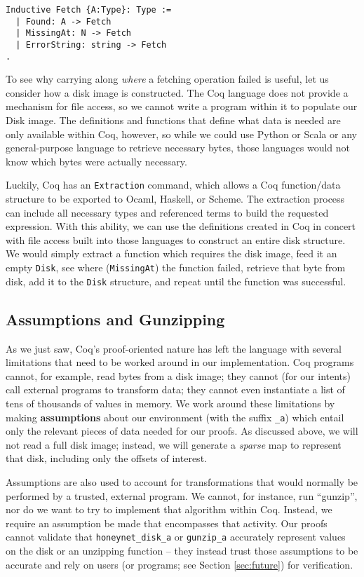 \documentclass[nocopyrightspace,preprint]{sigplanconf}
\begin{document}
\begin{lstlisting}
Inductive Fetch {A:Type}: Type :=
  | Found: A -> Fetch
  | MissingAt: N -> Fetch
  | ErrorString: string -> Fetch
.
\end{lstlisting}

To see why carrying along {\em where} a fetching operation failed is useful,
let us consider how a disk image is constructed. The Coq language does not
provide a mechanism for file access, so we cannot write a program within it to
populate our Disk image. The definitions and functions that define what data
is needed are only available within Coq, however, so while we could use Python
or Scala or any general-purpose language to retrieve necessary bytes, those
languages would not know which bytes were actually necessary.

Luckily, Coq has an {\tt Extraction} command, which allows a Coq function/data
structure to be exported to Ocaml, Haskell, or Scheme. The extraction process
can include all necessary types and referenced terms to build the requested
expression. With this ability, we can use the definitions created in Coq in
concert with file access built into those languages to construct an entire
disk structure. We would simply extract a function which requires the disk
image, feed it an empty {\tt Disk}, see where ({\tt MissingAt}) the function
failed, retrieve that byte from disk, add it to the {\tt Disk} structure, and
repeat until the function was successful.

\subsection{Assumptions and Gunzipping}
\label{subsec:gunzip}

As we just saw, Coq's proof-oriented nature has left the language with several
limitations that need to be worked around in our implementation. Coq programs
cannot, for example, read bytes from a disk image; they cannot (for our
intents) call external programs to transform data; they cannot even
instantiate a list of tens of thousands of values in memory. We work around
these limitations by making {\bf assumptions} about our environment (with the
suffix {\tt \_a}) which entail only the relevant pieces of data needed for our
proofs. As discussed above, we will not read a full disk image; instead, we
will generate a {\it sparse} map to represent that disk, including only the
offsets of interest.

Assumptions are also used to account for transformations that would normally
be performed by a trusted, external program. We cannot, for instance, run
``gunzip'', nor do we want to try to implement that algorithm within Coq.
Instead, we require an assumption be made that encompasses that activity. Our
proofs cannot validate that {\tt honeynet\_disk\_a} or {\tt gunzip\_a}
accurately represent values on the disk or an unzipping function -- they
instead trust those assumptions to be accurate and rely on users (or programs;
see Section \ref{sec:future}) for verification.
\end{document}
